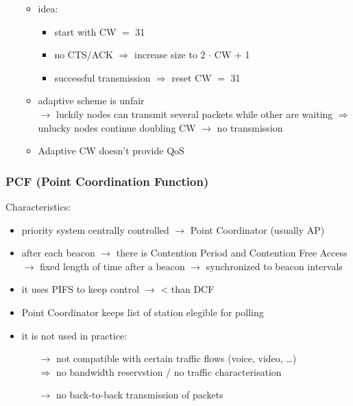 \begin{itemize}
\begin{itemize}
        \item[] \begin{itemize}
            \item idea:
            \begin{itemize}
                \item start with CW $=$ 31
                \item no CTS/ACK $\Rightarrow$ increase size to 2 $\cdot$ CW $+$ 1
                \item successful transmission $\Rightarrow$ reset CW $=$ 31
            \end{itemize}
            \item adaptive scheme is unfair\\[0.15cm]
            $\rightarrow$ luckily nodes can transmit several packets while other are waiting
            $\Rightarrow$ unlucky nodes continue doubling CW $\rightarrow$ no transmission
            \item Adaptive CW doesn't provide QoS
        \end{itemize}
    \end{itemize}
\end{itemize}
\subsubsection{PCF (Point Coordination Function)}
Characteristics:
\begin{itemize}
    \item priority system centrally controlled $\rightarrow$ Point Coordinator (usually AP)
    \item after each beacon $\rightarrow$ there is Contention Period and Contention Free Access\\[0.15cm]
    $\rightarrow$ fixed length of time after a beacon $\rightarrow$ synchronized to beacon intervals
    \item it uses PIFS to keep control $\rightarrow$ < than DCF
    \item Point Coordinator keeps list of station elegible for polling
    \item it is not used in practice:
    \begin{itemize}
        \item[$\rightarrow$] not compatible with certain traffic flows (voice, video, \dots)\\[0.15cm]
        $\Rightarrow$ no bandwidth reservstion / no traffic characterisation
        \item[$\rightarrow$] no back-to-back transmission of packets
    \end{itemize}
\end{itemize}
